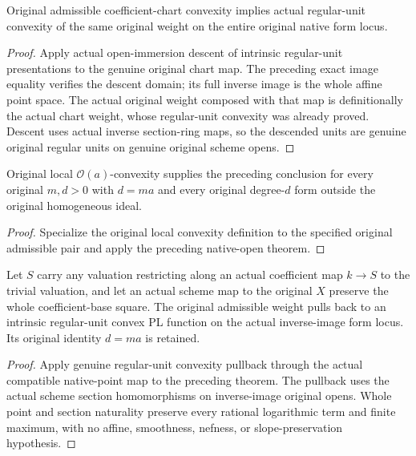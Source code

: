 \begin{lemma}
\label{projective:actual-original-native-admissible-convexity}
\leanok
{}
Original admissible coefficient-chart convexity implies actual regular-unit
convexity of the same original weight on the entire original native form locus.
\end{lemma}
\begin{proof}
Apply actual open-immersion descent of intrinsic regular-unit presentations to
the genuine original chart map. The preceding exact image equality verifies
the descent domain; its full inverse image is the whole affine point space.
The actual original weight composed with that map is definitionally the actual
chart weight, whose regular-unit convexity was already proved. Descent uses
actual inverse section-ring maps, so the descended units are genuine original
regular units on genuine original scheme opens.
\end{proof}

\begin{corollary}
\label{projective:actual-original-native-prescribed-class-convexity}
\leanok
{}
Original local $\mathcal O(a)$-convexity supplies the preceding conclusion
for every original $m,d>0$ with $d=ma$ and every original degree-$d$
form outside the original homogeneous ideal.
\end{corollary}
\begin{proof}
Specialize the original local convexity definition to the specified original
admissible pair and apply the preceding native-open theorem.
\end{proof}

\begin{theorem}
\label{projective:actual-original-native-prescribed-convexity-pullback}
\leanok
{}
Let $S$ carry any valuation restricting along an actual coefficient map
$k\to S$ to the trivial valuation, and let an actual scheme map to the
original $X$ preserve the whole coefficient-base square. The original
admissible weight pulls back to an intrinsic regular-unit convex PL function
on the actual inverse-image form locus. Its original identity $d=ma$ is retained.
\end{theorem}
\begin{proof}
Apply genuine regular-unit convexity pullback through the actual compatible
native-point map to the preceding theorem. The pullback uses the actual scheme
section homomorphisms on inverse-image original opens. Whole point and section
naturality preserve every rational logarithmic term and finite maximum, with
no affine, smoothness, nefness, or slope-preservation hypothesis.
\end{proof}
